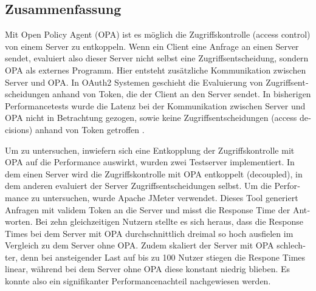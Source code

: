 \begin{otherlanguage}{ngerman}
	\chapter*{Zusammenfassung}
	Mit Open Policy Agent (OPA) ist es möglich die Zugriffskontrolle (access control) von einem Server zu entkoppeln. Wenn ein Client eine Anfrage an einen Server sendet, evaluiert also dieser Server nicht selbst eine Zugriffsentscheidung, sondern OPA als externes Programm. Hier entsteht zusätzliche Kommunikation zwischen Server und OPA. In OAuth2 Systemen geschieht die Evaluierung von Zugriffsentscheidungen anhand von Token, die der Client an den Server sendet. In bisherigen Performancetests wurde die Latenz bei der Kommunikation zwischen Server und OPA nicht in Betrachtung gezogen, sowie keine Zugriffsentscheidungen (access decisions) anhand von Token getroffen \citep{opaperformance:2021:07}.\smallskip

	Um zu untersuchen, inwiefern sich eine Entkopplung der Zugriffskontrolle mit OPA auf die Performance auswirkt, wurden zwei Testserver implementiert. In dem einen Server wird die Zugriffskontrolle mit OPA entkoppelt (decoupled), in dem anderen evaluiert der Server Zugriffsentscheidungen selbst. Um die Performance zu untersuchen, wurde Apache JMeter verwendet. Dieses Tool generiert Anfragen mit validem Token an die Server und misst die Response Time der Antworten. Bei zehn gleichzeitigen Nutzern stellte es sich heraus, dass die Response Times bei dem Server mit OPA durchschnittlich dreimal so hoch ausfielen im Vergleich zu dem Server ohne OPA. Zudem skaliert der Server mit OPA schlechter, denn bei ansteigender Last auf bis zu 100 Nutzer stiegen die Respone Times linear, während bei dem Server ohne OPA diese konstant niedrig blieben. Es konnte also ein signifikanter Performancenachteil nachgewiesen werden. 
	

\end{otherlanguage}
